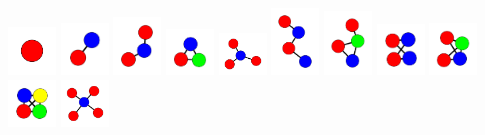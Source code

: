 \documentclass[openany]{tufte-book} %
\theoremstyle{plain}
\begin{document}
\begin{marginfigure}
		\includegraphics[width=0.5in]{graphs/all/0.pdf}
		\includegraphics[width=0.5in]{graphs/all/1.pdf}
		\includegraphics[width=0.5in]{graphs/all/011.pdf}
		\includegraphics[width=0.5in]{graphs/all/111.pdf}
		\includegraphics[width=0.5in]{graphs/all/001011.pdf}
		\includegraphics[width=0.5in]{graphs/all/011010.pdf}
		\includegraphics[width=0.5in]{graphs/all/011011.pdf}
		\includegraphics[width=0.5in]{graphs/all/011110.pdf}
		\includegraphics[width=0.5in]{graphs/all/011111.pdf}
		\includegraphics[width=0.5in]{graphs/all/111111.pdf}
		\includegraphics[width=0.5in]{graphs/all/0001001011.pdf}

\end{marginfigure}
\end{document}
